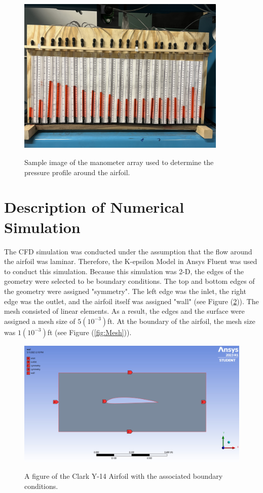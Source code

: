 \documentclass[
	12pt, %
]{fluids_report_style}
\begin{document}
\begin{figure}[H]%
    \centering
    {{\includegraphics[width=10cm]{figures/IMG_0249.jpg} }}%
    \caption{Sample image of the manometer array used to determine the pressure profile around the airfoil.}
    \label{fig:manometer}%
\end{figure}  


\section{Description of Numerical Simulation} 

The CFD simulation was conducted under the assumption that the flow around the airfoil was laminar. Therefore, the K-epsilon Model in Ansys Fluent \cite{ansys} was used to conduct this simulation. Because this simulation was 2-D, the edges of the geometry were selected to be boundary conditions. The top and bottom edges of the geometry were assigned "symmetry". The left edge was the inlet, the right edge was the outlet, and the airfoil itself was assigned "wall" (see Figure (\ref{fig:BC})). The mesh consisted of linear elements. As a result, the edges and the surface were assigned a mesh size of $5(10^{-3})$ft. At the boundary of the airfoil, the mesh size was $1(10^{-3})$ft (see Figure (\ref{fig:Mesh})). 

\begin{figure}[H]%
    \centering
    {{\includegraphics[width=15cm]{figures/BoudnaryConditionsFigure.jpg} }}%
    \caption{A figure of the Clark Y-14 Airfoil with the associated boundary conditions.}
    \label{fig:BC}%
\end{figure}  
\end{document}
